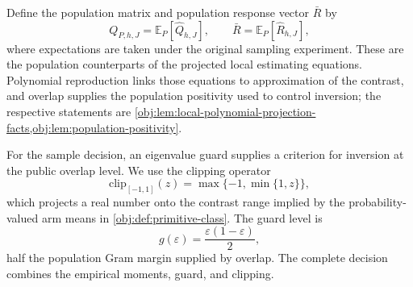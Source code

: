 \documentclass[11pt]{article}
\begin{document}
Define the population matrix  and population response vector \(\bar R\) by
\[
Q_{P,h,J}=\mathbb E_P[\widehat Q_{h,J}],
\qquad
\bar R=\mathbb E_P[\widehat R_{h,J}],
\]
where expectations are taken under the original sampling experiment. These are the population counterparts of the projected local estimating equations. Polynomial reproduction links those equations to approximation of the contrast, and overlap supplies the population positivity used to control inversion; the respective statements are \cref{obj:lem:local-polynomial-projection-facts,obj:lem:population-positivity}.

For the sample decision, an eigenvalue guard supplies a criterion for inversion at the public overlap level. We use the clipping operator
\[
\mathrm{clip}_{[-1,1]}(z)
=\max\{-1,\min\{1,z\}\},
\]
which projects a real number onto the contrast range implied by the probability-valued arm means in \cref{obj:def:primitive-class}. The guard level is
\[
g(\varepsilon)=\frac{\varepsilon(1-\varepsilon)}{2},
\]
half the population Gram margin supplied by overlap. The complete decision combines the empirical moments, guard, and clipping.
\end{document}
